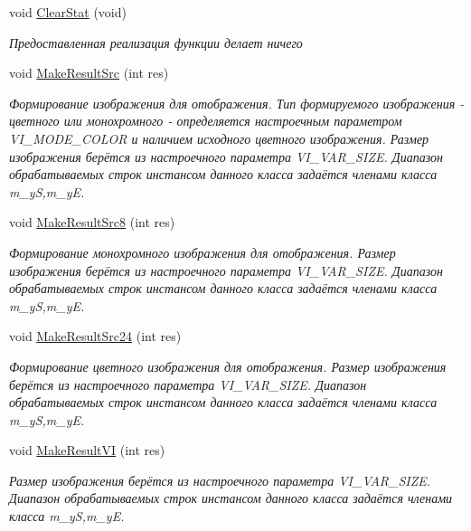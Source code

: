 \begin{DoxyCompactItemize}
void \hyperlink{class_c_v_i_engine_thread_a608a3c62caea2e713736b5b8efd2f6ea}{Clear\+Stat} (void)
\begin{DoxyCompactList}\small\item\em Предоставленная реализация функции делает ничего \end{DoxyCompactList}\item 
void \hyperlink{class_c_v_i_engine_thread_a36b1ea71981bd36fa9545fa68e98e78b}{Make\+Result\+Src} (int res)
\begin{DoxyCompactList}\small\item\em Формирование изображения для отображения. Тип формируемого изображения -\/ цветного или монохромного -\/ определяется настроечным параметром V\+I\+\_\+\+M\+O\+D\+E\+\_\+\+C\+O\+L\+O\+R и наличием исходного цветного изображения. Размер изображения берётся из настроечного параметра V\+I\+\_\+\+V\+A\+R\+\_\+\+S\+I\+Z\+E. Диапазон обрабатываемых строк инстансом данного класса задаётся членами класса m\+\_\+y\+S,m\+\_\+y\+E. \end{DoxyCompactList}\item 
void \hyperlink{class_c_v_i_engine_thread_a30b43140ec42578567286895a960cb4f}{Make\+Result\+Src8} (int res)
\begin{DoxyCompactList}\small\item\em Формирование монохромного изображения для отображения. Размер изображения берётся из настроечного параметра V\+I\+\_\+\+V\+A\+R\+\_\+\+S\+I\+Z\+E. Диапазон обрабатываемых строк инстансом данного класса задаётся членами класса m\+\_\+y\+S,m\+\_\+y\+E. \end{DoxyCompactList}\item 
void \hyperlink{class_c_v_i_engine_thread_a3df2d213ef88168193cabc7a6bad8c6c}{Make\+Result\+Src24} (int res)
\begin{DoxyCompactList}\small\item\em Формирование цветного изображения для отображения. Размер изображения берётся из настроечного параметра V\+I\+\_\+\+V\+A\+R\+\_\+\+S\+I\+Z\+E. Диапазон обрабатываемых строк инстансом данного класса задаётся членами класса m\+\_\+y\+S,m\+\_\+y\+E. \end{DoxyCompactList}\item 
void \hyperlink{class_c_v_i_engine_thread_a02bac0a7df7e985164b867ea3433bb40}{Make\+Result\+V\+I} (int res)
\begin{DoxyCompactList}\small\item\em Размер изображения берётся из настроечного параметра V\+I\+\_\+\+V\+A\+R\+\_\+\+S\+I\+Z\+E. Диапазон обрабатываемых строк инстансом данного класса задаётся членами класса m\+\_\+y\+S,m\+\_\+y\+E. \end{DoxyCompactList}\item 

\end{DoxyCompactItemize}
